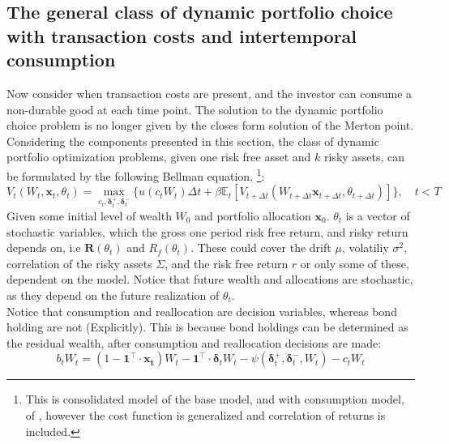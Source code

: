 \documentclass[11pt]{article}
\begin{document}
\subsection{The general class of dynamic portfolio choice with transaction costs and intertemporal consumption} \label{Subsection: Dynamic-portfolio-choice}
Now consider when transaction costs are present, and the investor can consume a non-durable good at each time point.
The solution to the dynamic portfolio choice problem is no longer given by the closes form solution of the Merton point.
Considering the components presented in this section,
the class of dynamic portfolio optimization problems, given one risk free asset and $k$ risky assets, can be formulated 
by the following Bellman equation, \textcite{Bellman1958}\footnote{This is consolidated model of the base model, and with consumption model, of \textcite{CaiJuddXu2020},
however the cost function is generalized and correlation of returns is included.}:
\begin{equation} \label{eq: class_bellman_non_normalized}
  V_{t} (W_t , \mathbf{x}_{t}, \theta_t) = \max_{c_t , \boldsymbol{\delta}^{+}_{t}, \boldsymbol{\delta}^{-}_{t}  } \{ u(c_t W_t ) 
  \Delta t + \beta \mathbb{E}_{t} \left[ 
    V_{t+\Delta t} (W_{t+\Delta t } \mathbf{x}_{t+\Delta t }, \theta_{t + \Delta t }  ) 
    \right] \}, \quad t < T 
\end{equation}
Given some initial level of wealth $W_0$ and portfolio allocation $\mathbf{x}_0$. \( \theta_t \) is a vector of stochastic variables, which
the gross one period risk free return, and risky return depends on, i.e \( \mathbf{R}(\theta_t) \) and \( R_f (\theta_t) \).
These could cover the drift $\mu $, volatiliy $\sigma^{2}$, correlation of the risky assets $\Sigma$, and the risk free return $r$ or only some of these, dependent on the model.
Notice that future wealth and allocations are stochastic, as they depend on the future realization of $\theta_t$.\\
Notice that consumption and reallocation are decision variables, whereas bond holding are not (Explicitly).
This is because bond holdings can be determined as the residual wealth, after consumption and reallocation decisions are made:
\begin{equation}\label{eq: class_bond_holdings_non_normalized}
  b_{t} W_t = \left( 1 - \mathbf{1}^{\top} \cdot \mathbf{x_t}  \right) W_t - \mathbf{1}^{\top} \cdot \boldsymbol{\delta}_t W_t 
  - \psi (\boldsymbol{\delta}^{+}_{t}, \boldsymbol{\delta}^{-}_t , W_t)
  - c_t W_t
\end{equation}
\end{document}
